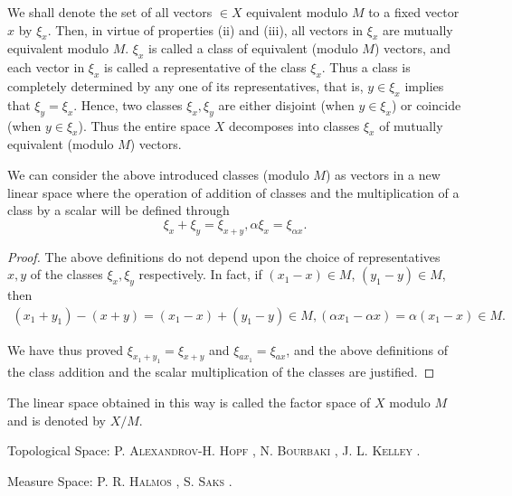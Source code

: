 We shall denote the set of all vectors $\in X$ equivalent modulo $M$ to a fixed vector $x$ by $\xi_{x}$. Then, in virtue of properties (ii) and (iii), all vectors in $\xi_{x}$ are mutually equivalent modulo $M$. $\xi_{x}$ is called a class of equivalent (modulo $M$) vectors, and each vector in $\xi_{x}$ is called a representative of the class $\xi_{x}$. Thus a class is completely determined by any one of its representatives, that is, $y \in \xi_{x}$ implies that $\xi_{y} = \xi_{x}$. Hence, two classes $\xi_{x}, \xi_{y}$ are either disjoint (when $y \in \xi_{x}$) or coincide (when $y \in \xi_{x}$). Thus the entire space $X$ decomposes into classes $\xi_{x}$ of mutually equivalent (modulo $M$) vectors. 

\begin{theoremu} We can consider the above introduced classes (modulo $M$) as vectors in a new linear space where the operation of addition of classes and the multiplication of a class by a scalar will be defined through 
\[
\xi_{x} + \xi_{y} = \xi_{x+y}, \alpha \xi_{x} = \xi_{\alpha x}.
\]
\end{theoremu}

\begin{proof}
 The above definitions do not depend upon the choice of representatives $x, y$ of the classes $\xi_x, \xi_y$ respectively. In fact, if $(x_1- x) \in M$, $(y_1- y) \in M$, then 
\[
\begin{gathered}
(x _{1} + y _{1})- (x + y) = (x _{1}- x) + (y _{1}- y) \in M, (\alpha x _{1}- \alpha x) = \alpha (x _{1}- x) \in M.
\end{gathered}
\]

We have thus proved $\xi_{x_{1}+y_{1}}=\xi_{x+y}$ and $\xi_{ax_{1}}=\xi_{ax}$, and the above definitions of the class addition and the scalar multiplication of the classes are justified. 
\end{proof}

\begin{definitionu} The linear space obtained in this way is called the factor space of $X$ modulo $M$ and is denoted by $X/M$. 
\end{definitionu}


Topological Space: P. \textsc{Alexandrov}-H. \textsc{Hopf} \cite{alexandrov6}, N. \textsc{Bourbaki} \cite{bourbaki26}, J. L. \textsc{Kelley} \cite{kelley146}. 

Measure Space: P. R. \textsc{Halmos} \cite{halmos92}, S. \textsc{Saks} \cite{saks280}. 

